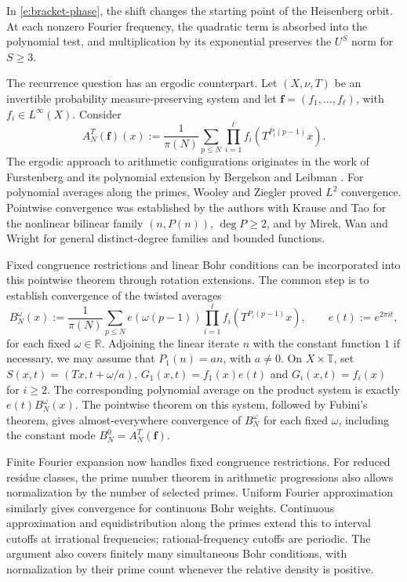 \documentclass[12pt]{amsart}
\newcommand{\1}{\mathbf 1}
\theoremstyle{definition}
\begin{document}
In \eqref{e:bracket-phase}, the shift changes the starting point of
the Heisenberg orbit. At each nonzero Fourier frequency, the
quadratic term is absorbed into the polynomial test, and
multiplication by its exponential preserves the $U^S$ norm for
$S\geq3$.

\bigskip

The recurrence question has an ergodic counterpart. Let $(X,\nu,T)$
be an invertible probability measure-preserving system and let
$\mathbf f=(f_1,\ldots,f_\ell)$, with $f_i\in L^\infty(X)$. Consider
\begin{equation}\label{e:prime-ergodic-average}
 A_N^T(\mathbf f)(x)
 :=\frac1{\pi(N)}\sum_{p\leq N}
       \prod_{i=1}^{\ell}f_i(T^{P_i(p-1)}x).
\end{equation}
The ergodic approach to arithmetic configurations originates in
the work of Furstenberg \cite{Furstenberg} and its polynomial
extension by Bergelson and Leibman \cite{BergelsonLeibman}.
For polynomial averages along the primes, Wooley and Ziegler
\cite{WooleyZiegler} proved $L^2$ convergence. Pointwise convergence
was established by the authors with Krause and  Tao
\cite{KMTTPrimes} for the nonlinear bilinear family $(n,P(n))$,
$\deg P\geq2$, and by Mirek, Wan and Wright
\cite[Theorem~1.1(ii)]{MirekWanWright} for general distinct-degree
families and bounded functions. 

Fixed congruence restrictions and linear Bohr conditions can be
incorporated into this pointwise theorem through rotation extensions.
The common step is to establish convergence of the twisted averages
\[
 B_N^\omega(x)
 :=\frac1{\pi(N)}\sum_{p\leq N}e(\omega(p-1))
       \prod_{i=1}^{\ell}f_i(T^{P_i(p-1)}x),
 \qquad e(t):=e^{2\pi it},
\]
for each fixed $\omega\in\mathbb R$. Adjoining the linear iterate $n$
with the constant function $1$ if necessary, we may assume that
$P_1(n)=an$, with $a\ne0$. On $X\times\mathbb T$, set
$S(x,t)=(Tx,t+\omega/a)$, $G_1(x,t)=f_1(x)e(t)$ and
$G_i(x,t)=f_i(x)$ for $i\geq2$. The corresponding polynomial average
on the product system is exactly $e(t)B_N^\omega(x)$.
The pointwise theorem on this system, followed by Fubini's theorem,
gives almost-everywhere convergence of $B_N^\omega$ for each
fixed $\omega$, including the constant mode
$B_N^0=A_N^T(\mathbf f)$.

Finite Fourier expansion now handles fixed congruence restrictions.
For reduced residue classes, the prime number theorem in arithmetic
progressions also allows normalization by the number of selected
primes. Uniform Fourier approximation similarly gives convergence
for continuous Bohr weights. Continuous approximation and
equidistribution along the primes extend this to interval cutoffs
at irrational frequencies; rational-frequency cutoffs are periodic.
The argument also covers finitely many simultaneous Bohr conditions,
with normalization by their prime count whenever the relative
density is positive.
\end{document}
